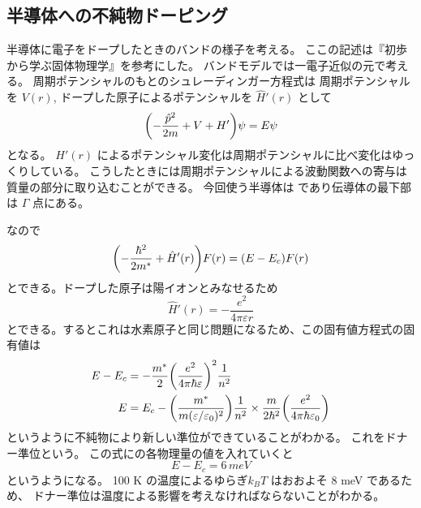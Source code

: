 \documentclass[11pt,dvipdfmx,a4paper]{jsarticle}
\begin{document}
\subsection{半導体への不純物ドーピング}
半導体に電子をドープしたときのバンドの様子を考える。
ここの記述は『初歩から学ぶ固体物理学\cite{Yaguchi_2017}』を参考にした。
バンドモデルでは一電子近似の元で考える。
周期ポテンシャルのもとのシュレーディンガー方程式は
周期ポテンシャルを \(V(r)\), ドープした原子によるポテンシャルを \(\hat{H}'(r)\) として
\begin{equation}
	\qty(-\frac{\hat{p}^2}{2m}+V+H')\psi = E \psi
\end{equation}
となる。
\(H'(r)\) によるポテンシャル変化は周期ポテンシャルに比べ変化はゆっくりしている。
こうしたときには周期ポテンシャルによる波動関数への寄与は質量の部分に取り込むことができる。
今回使う半導体は  であり伝導体の最下部は \(\Gamma\) 点にある。

なので
\begin{equation}
	\qty(-\frac{\hbar^2}{2m^*}+\hat{H}'(r))F(r) = (E-E_c)F(r)
\end{equation}
とできる。ドープした原子は陽イオンとみなせるため
\begin{equation}
	\hat{H}'(r) = -\frac{e^2}{4\pi\varepsilon r}
\end{equation}
とできる。するとこれは水素原子と同じ問題になるため、この固有値方程式の固有値は
\begin{align}
	E-E_c &= -\frac{m^*}{2}\qty(\frac{e^2}{4\pi\hbar\varepsilon})^2\frac{1}{n^2}\\
    E &= E_c -\qty(\frac{m^*}{m(\varepsilon/\varepsilon_0)^2})\frac{1}{n^2}\times\frac{m}{2\hbar^2}\qty(\frac{e^2}{4\pi \hbar\varepsilon_0})
\end{align}
というように不純物により新しい準位ができていることがわかる。
これをドナー準位という。
この式にの各物理量の値を入れていくと
\begin{equation}
    E-E_c = 6\,\si{meV}
\end{equation}
というようになる。
100 K の温度によるゆらぎ\(k_B T\) はおおよそ 8 meV であるため、
ドナー準位は温度による影響を考えなければならないことがわかる。
\end{document}
